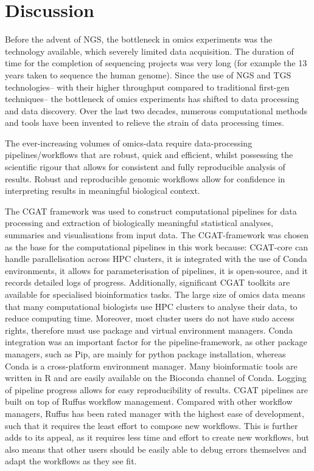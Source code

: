 \afterpage{\clearpage}


\afterpage{\clearpage}


\section{Discussion}

Before the advent of NGS, the bottleneck in omics experiments was the technology available, which severely limited data acquisition.
The duration of time for the completion of sequencing projects was very long (for example the 13 years taken to sequence the human genome).
Since the use of NGS and TGS technologies-- with their higher throughput compared to traditional first-gen techniques-- the bottleneck of omics experiments has shifted to data processing and data discovery.
Over the last two decades, numerous computational methods and tools have been invented to relieve the strain of data processing times.

The ever-increasing volumes of omics-data require data-processing pipelines/workflows that are robust, quick and efficient, whilst possessing the scientific rigour that allows for consistent and fully reproducible analysis of results.
Robust and reproducible genomic workflows allow for confidence in interpreting results in meaningful biological context.

The CGAT framework was used to construct computational pipelines for data processing and extraction of biologically meaningful statistical analyses, summaries and visualisations from input data.
The CGAT-framework was chosen as the base for the computational pipelines in this work because: CGAT-core can handle parallelisation across HPC clusters, it is integrated with the use of Conda environments, it allows for parameterisation of pipelines, it is open-source, and it records detailed logs of progress. Additionally, significant CGAT toolkits are available for specialised bioinformatics tasks.
The large size of omics data means that many computational biologists use HPC clusters to analyse their data, to reduce computing time. Moreover, most cluster users do not have sudo access rights, therefore must use package and virtual environment managers.
Conda integration was an important factor for the pipeline-framework, as other package managers, such as Pip, are mainly for python package installation, whereas Conda is a cross-platform environment manager.
Many bioinformatic tools are written in R and are easily available on the Bioconda channel of Conda.
Logging of pipeline progress allows for easy reproducibility of results.
CGAT pipelines are built on top of Ruffus workflow management.
Compared with other workflow managers, Ruffus has been rated manager with the highest ease of development, such that it requires the least effort to compose new workflows\cite{leipzig2017review}.
This is further adds to its appeal, as it requires less time and effort to create new workflows, but also means that other users should be easily able to debug errors themselves and adapt the workflows as they see fit.

